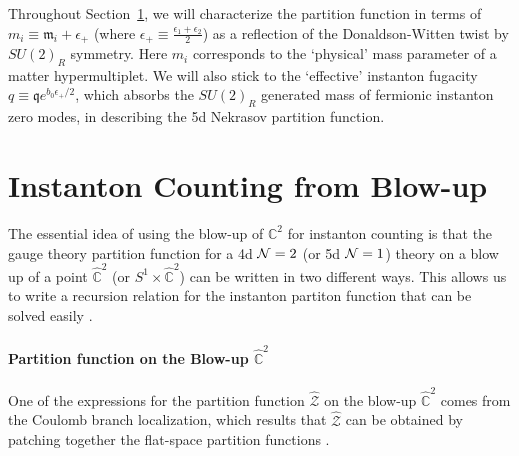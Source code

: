 \documentclass[letterpaper, 11pt]{article}
\def\IC{\mathbb{C}}
\def\CN{{\cal N}}
\begin{document}
Throughout Section~\ref{sec:blowup}, we will characterize the partition function in terms of $m_i \equiv \mathfrak{m}_i + \epsilon_+$ (where $\epsilon_+ \equiv \frac{\epsilon_1 + \epsilon_2}{2}$) as a reflection of the Donaldson-Witten twist by $SU(2)_R$ symmetry. Here $m_i$ corresponds to the `physical' mass parameter of a matter hypermultiplet. We will also stick to the `effective' instanton fugacity $q \equiv \mathfrak{q} e^{{b_0}\epsilon_+/2}$, which absorbs the $SU(2)_R$ generated mass of fermionic instanton zero modes, in describing the 5d Nekrasov partition function.


\section{Instanton Counting from Blow-up} \label{sec:blowup}



The essential idea of using the blow-up of ${\IC}^2$ for instanton counting is that the gauge theory partition function for a 4d $\CN=2$ (or 5d $\CN=1$) theory on a blow up of a point $\hat{\IC}^2$ (or $S^1 \times \hat{\IC}^2$) can be written in two different ways. This allows us to write a recursion relation for the instanton partiton function that can be solved easily \cite{Nakajima:2003pg, Nakajima:2003uh,Nakajima:2005fg, Keller:2012da}. 






\paragraph{Partition function on the Blow-up $\hat{\IC}^2$}

One of the expressions for the partition function $\hat{\mathcal{Z}}$ on the blow-up $\hat{\IC}^2$ comes from the Coulomb branch localization, which results that $\hat{\mathcal{Z}}$ can be obtained by patching together the flat-space partition functions \cite{Nekrasov:2003vi}.
\end{document}
